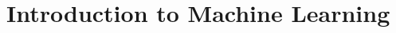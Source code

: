 \section{Introduction to Machine Learning} \label{Sec: Introduction to Machine Learning}

\cite{kaurIntroductionMachineLearning2021}